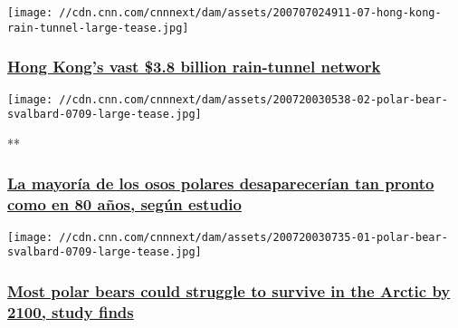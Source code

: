 \href{/style/article/hong-kong-tunnels-climate-crisis-intl-hnk-dst/index.html}{}

\texttt{[image: //cdn.cnn.com/cnnnext/dam/assets/200707024911-07-hong-kong-rain-tunnel-large-tease.jpg]}

\hypertarget{hong-kongs-vast-38-billion-rain-tunnel-network}{%
\subsubsection{\texorpdfstring{\href{/style/article/hong-kong-tunnels-climate-crisis-intl-hnk-dst/index.html}{Hong
Kong's vast \$3.8 billion rain-tunnel
network}}{Hong Kong's vast \$3.8 billion rain-tunnel network}}\label{hong-kongs-vast-38-billion-rain-tunnel-network}}

\href{/videos/spanish/2020/07/21/osos-polares-desaparecer-2100-artico-cambio-climatico-gases-efecto-invernadero-80-anos-revista-nature-climate-change-sobrevivir-poblacion-especies-guillermo-arduino-encuentro-cnne.cnn}{}

\texttt{[image: //cdn.cnn.com/cnnnext/dam/assets/200720030538-02-polar-bear-svalbard-0709-large-tease.jpg]}

**

\hypertarget{la-mayoruxeda-de-los-osos-polares-desapareceruxedan-tan-pronto-como-en-80-auxf1os-seguxfan-estudio}{%
\subsubsection{\texorpdfstring{\href{/videos/spanish/2020/07/21/osos-polares-desaparecer-2100-artico-cambio-climatico-gases-efecto-invernadero-80-anos-revista-nature-climate-change-sobrevivir-poblacion-especies-guillermo-arduino-encuentro-cnne.cnn}{La
mayoría de los osos polares desaparecerían tan pronto como en 80 años,
según
estudio}}{La mayoría de los osos polares desaparecerían tan pronto como en 80 años, según estudio}}\label{la-mayoruxeda-de-los-osos-polares-desapareceruxedan-tan-pronto-como-en-80-auxf1os-seguxfan-estudio}}

\href{/2020/07/20/weather/polar-bears-survival-threatened-arctic-climate-change/index.html}{}

\texttt{[image: //cdn.cnn.com/cnnnext/dam/assets/200720030735-01-polar-bear-svalbard-0709-large-tease.jpg]}

\hypertarget{most-polar-bears-could-struggle-to-survive-in-the-arctic-by-2100-study-finds}{%
\subsubsection{\texorpdfstring{\href{/2020/07/20/weather/polar-bears-survival-threatened-arctic-climate-change/index.html}{Most
polar bears could struggle to survive in the Arctic by 2100, study
finds}}{Most polar bears could struggle to survive in the Arctic by 2100, study finds}}\label{most-polar-bears-could-struggle-to-survive-in-the-arctic-by-2100-study-finds}}

